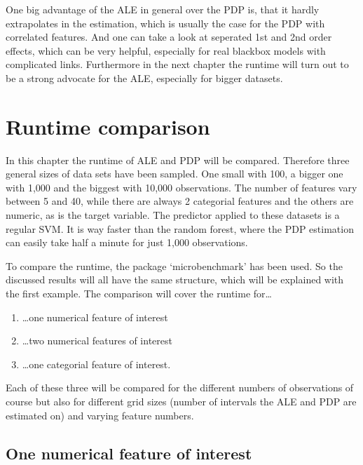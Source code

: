 \documentclass[
]{krantz}
\providecommand{\tightlist}{%
  \setlength{\itemsep}{0pt}\setlength{\parskip}{0pt}}
\begin{document}
One big advantage of the ALE in general over the PDP is, that it hardly extrapolates in the estimation, which is usually the case for the PDP with correlated features. And one can take a look at seperated 1st and 2nd order effects, which can be very helpful, especially for real blackbox models with complicated links. Furthermore in the next chapter the runtime will turn out to be a strong advocate for the ALE, especially for bigger datasets.

\hypertarget{runtime-comparison}{%
\section{Runtime comparison}\label{runtime-comparison}}

In this chapter the runtime of ALE and PDP will be compared. Therefore three general sizes of data sets have been sampled. One small with 100, a bigger one with 1,000 and the biggest with 10,000 observations. The number of features vary between 5 and 40, while there are always 2 categorial features and the others are numeric, as is the target variable. The predictor applied to these datasets is a regular SVM. It is way faster than the random forest, where the PDP estimation can easily take half a minute for just 1,000 observations.

To compare the runtime, the package `microbenchmark' has been used. So the discussed results will all have the same structure, which will be explained with the first example.
The comparison will cover the runtime for\ldots{}

\begin{enumerate}
\def\labelenumi{\arabic{enumi}.}
\tightlist
\item
  \ldots one numerical feature of interest
\item
  \ldots two numerical features of interest
\item
  \ldots one categorial feature of interest.
\end{enumerate}

Each of these three will be compared for the different numbers of observations of course but also for different grid sizes (number of intervals the ALE and PDP are estimated on) and varying feature numbers.

\hypertarget{one-numerical-feature-of-interest}{%
\subsection{One numerical feature of interest}\label{one-numerical-feature-of-interest}}
\end{document}
